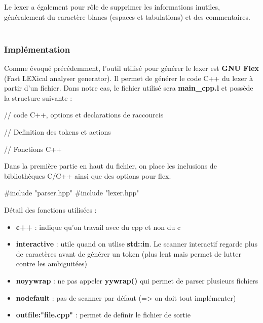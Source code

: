 \documentclass[a4paper]{article}%
\begin{document}
Le \gls{lexer} a également pour rôle de supprimer les informations inutiles,
généralement du caractère blancs (espaces et tabulations) et des
commentaires.\\~\\

\subsubsection*{Implémentation}

Comme évoqué précédemment, l'outil utilisé pour générer le \gls{lexer} est
\textbf{GNU Flex} (Fast LEXical analyser generator). Il permet de générer le
code C++ du \gls{lexer} à partir d'un fichier. Dans notre cas, le fichier utilisé
sera \textbf{main\_cpp.l} et possède la structure suivante
\cite{compilerFlexBison} :

\begin{code}
// code C++, options et declarations de raccourcis

// Definition des tokens et actions

// Fonctions C++
\end{code}\leavevmode\newline

\noindent

Dans la première partie en haut du fichier, on place les inclusions de
bibliothèques C/C++ ainsi que des options pour flex.

\begin{code}
#include "parser.hpp"
#include "lexer.hpp"

\end{code}\leavevmode\newline

Détail des fonctions utilisées :
\begin{itemize}
  \item \textbf{c++} : indique qu'on travail avec du cpp et non du c
  \item \textbf{interactive} : utile quand on utlise \textbf{std::in}. Le
    scanner interactif regarde plus de caractères avant de générer un token
    (plus lent mais permet de lutter contre les ambiguitées)
  \item \textbf{noyywrap} : ne pas appeler \textbf{yywrap()} qui permet de parser plusieurs fichiers
  \item \textbf{nodefault} : pas de scanner par défaut (=> on doit tout implémenter)
  \item \textbf{outfile:"file.cpp"} : permet de definir le fichier de sortie
\end{itemize}\leavevmode\\
\end{document}
